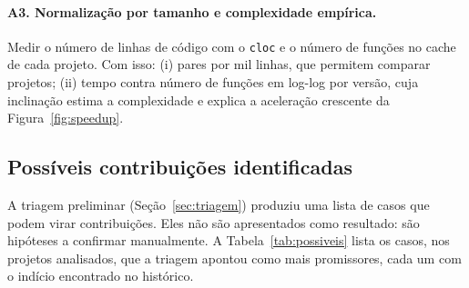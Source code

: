 \documentclass{article}
\newcommand{\scene}[2]{\todo[size=\tiny,color=blue!10]{#1 (#2)}}
\begin{document}
\paragraph{A3. Normalização por tamanho e complexidade empírica.}
Medir o número de linhas de código com o \texttt{cloc} e o número de funções no cache de cada projeto. Com isso: (i) pares por mil linhas, que permitem comparar projetos; (ii) tempo contra número de funções em log-log por versão, cuja inclinação estima a complexidade e explica a aceleração crescente da Figura~\ref{fig:speedup}.

\subsection{Possíveis contribuições identificadas}\label{sec:possiveis}

\scene{Scene 4d}{7:10--7:45}

A triagem preliminar (Seção~\ref{sec:triagem}) produziu uma lista de casos que podem virar contribuições. Eles não são apresentados como resultado: são hipóteses a confirmar manualmente. A Tabela~\ref{tab:possiveis} lista os casos, nos projetos analisados, que a triagem apontou como mais promissores, cada um com o indício encontrado no histórico.
\end{document}

